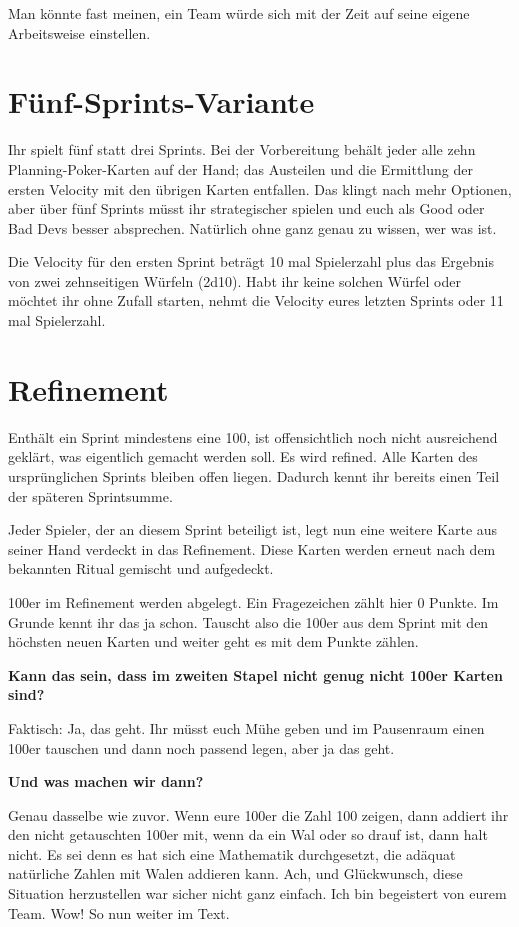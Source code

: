 \documentclass[10pt,a4paper]{article}
\newcommand{\qa}[2]{%
  \textbf{#1}\par
  #2
}
\begin{document}
Man könnte fast meinen, ein Team würde sich mit der Zeit auf seine eigene Arbeitsweise einstellen.

\section{Fünf-Sprints-Variante}

Ihr spielt fünf statt drei Sprints. Bei der Vorbereitung behält jeder alle zehn Planning-Poker-Karten auf der Hand; das Austeilen und die Ermittlung der ersten Velocity mit den übrigen Karten entfallen. Das klingt nach mehr Optionen, aber über fünf Sprints müsst ihr strategischer spielen und euch als Good oder Bad Devs besser absprechen. Natürlich ohne ganz genau zu wissen, wer was ist.

Die Velocity für den ersten Sprint beträgt 10 mal Spielerzahl plus das Ergebnis von zwei zehnseitigen Würfeln (2d10). Habt ihr keine solchen Würfel oder möchtet ihr ohne Zufall starten, nehmt die Velocity eures letzten Sprints oder 11 mal Spielerzahl.

\section{Refinement}

Enthält ein Sprint mindestens eine 100, ist offensichtlich noch nicht ausreichend geklärt, was eigentlich gemacht werden soll. Es wird refined. Alle Karten des ursprünglichen Sprints bleiben offen liegen. Dadurch kennt ihr bereits einen Teil der späteren Sprintsumme.

Jeder Spieler, der an diesem Sprint beteiligt ist, legt nun eine weitere Karte aus seiner Hand verdeckt in das Refinement. Diese Karten werden erneut nach dem bekannten Ritual gemischt und aufgedeckt.

100er im Refinement werden abgelegt. Ein Fragezeichen zählt hier 0 Punkte. Im Grunde kennt ihr das ja schon. Tauscht also die 100er aus dem Sprint mit den höchsten neuen Karten und weiter geht es mit dem Punkte zählen.

\qa{Kann das sein, dass im zweiten Stapel nicht genug nicht 100er Karten sind?}{Faktisch: Ja, das geht. Ihr müsst euch Mühe geben und im Pausenraum einen 100er tauschen und dann noch passend legen, aber ja das geht.}

\clearpage
\qa{Und was machen wir dann?}{Genau dasselbe wie zuvor. Wenn eure 100er die Zahl 100 zeigen, dann addiert ihr den nicht getauschten 100er mit, wenn da ein Wal oder so drauf ist, dann halt nicht. Es sei denn es hat sich eine Mathematik durchgesetzt, die adäquat natürliche Zahlen mit Walen addieren kann. Ach, und Glückwunsch, diese Situation herzustellen war sicher nicht ganz einfach. Ich bin begeistert von eurem Team. Wow! So nun weiter im Text.}
\end{document}
